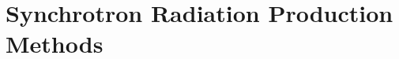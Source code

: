 \documentclass[../main.tex]{subfiles}
\begin{document}

\section{Synchrotron Radiation Production Methods}
\label{sec:synchrotron_radiation_intro}
\end{document}
